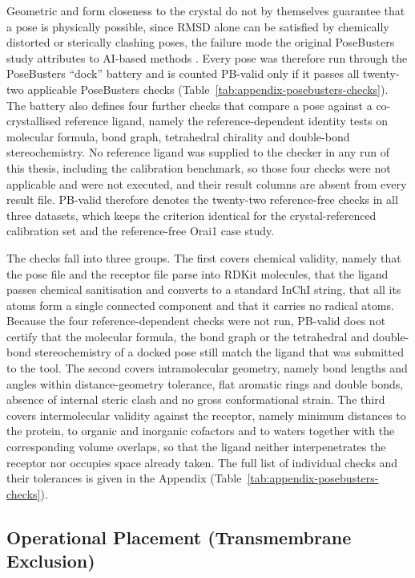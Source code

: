 Geometric and form closeness to the crystal do not by themselves guarantee that a pose is physically possible, since RMSD alone can be satisfied by chemically distorted or sterically clashing poses, the failure mode the original PoseBusters study attributes to AI-based methods \cite{ref035}. Every pose was therefore run through the PoseBusters ``dock'' battery and is counted PB-valid only if it passes all twenty-two applicable PoseBusters checks (Table~\ref{tab:appendix-posebusters-checks}). The battery also defines four further checks that compare a pose against a co-crystallised reference ligand, namely the reference-dependent identity tests on molecular formula, bond graph, tetrahedral chirality and double-bond stereochemistry. No reference ligand was supplied to the checker in any run of this thesis, including the calibration benchmark, so those four checks were not applicable and were not executed, and their result columns are absent from every result file. PB-valid therefore denotes the twenty-two reference-free checks in all three datasets, which keeps the criterion identical for the crystal-referenced calibration set and the reference-free Orai1 case study.

The checks fall into three groups. The first covers chemical validity, namely that the pose file and the receptor file parse into RDKit molecules, that the ligand passes chemical sanitisation and converts to a standard InChI string, that all its atoms form a single connected component and that it carries no radical atoms. Because the four reference-dependent checks were not run, PB-valid does not certify that the molecular formula, the bond graph or the tetrahedral and double-bond stereochemistry of a docked pose still match the ligand that was submitted to the tool. The second covers intramolecular geometry, namely bond lengths and angles within distance-geometry tolerance, flat aromatic rings and double bonds, absence of internal steric clash and no gross conformational strain. The third covers intermolecular validity against the receptor, namely minimum distances to the protein, to organic and inorganic cofactors and to waters together with the corresponding volume overlaps, so that the ligand neither interpenetrates the receptor nor occupies space already taken. The full list of individual checks and their tolerances is given in the Appendix (Table~\ref{tab:appendix-posebusters-checks}).

\hypertarget{operational-placement-transmembrane-exclusion}{%
\subsection{Operational Placement (Transmembrane Exclusion)}\label{operational-placement-transmembrane-exclusion}}


